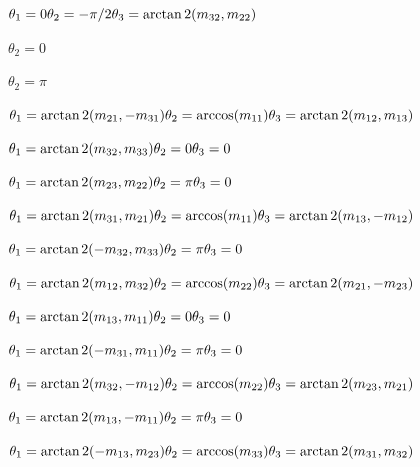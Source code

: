 \documentclass{article}
\begin{document}
$ \theta_1=0\\ \theta_2=-\pi/2\\ \theta_3=\arctan2(m_{32},m_{22}) $
\pagebreak

$\theta_2 = 0$
\pagebreak

$\theta_2 = π$
\pagebreak

$ \theta_1 = \arctan2(m_{21},-m_{31})\\\theta_2 =\arccos(m_{11}) \\\theta_3 = \arctan2(m_{12},m_{13}) $
\pagebreak

$ \theta_1=\arctan2(m_{32},m_{33})\\ \theta_2=0\\ \theta_3=0 $
\pagebreak

$ \theta_1=\arctan2(m_{23},m_{22})\\ \theta_2=\pi\\ \theta_3=0 $
\pagebreak

$ \theta_1 = \arctan2(m_{31},m_{21})\\\theta_2 = \arccos(m_{11}) \\\theta_3 = \arctan2(m_{13},-m_{12}) $
\pagebreak

$ \theta_1=\arctan2(-m_{32},m_{33})\\ \theta_2=\pi\\ \theta_3=0 $
\pagebreak

$ \theta_1 = \arctan2(m_{12},m_{32})\\\theta_2 = \arccos(m_{22}) \\\theta_3 = \arctan2(m_{21},-m_{23}) $
\pagebreak

$ \theta_1=\arctan2(m_{13},m_{11})\\ \theta_2=0\\ \theta_3=0 $
\pagebreak

$ \theta_1=\arctan2(-m_{31},m_{11})\\ \theta_2=\pi\\ \theta_3=0 $
\pagebreak

$ \theta_1 = \arctan2(m_{32},-m_{12})\\\theta_2 = \arccos(m_{22}) \\\theta_3 =\arctan2(m_{23},m_{21}) $
\pagebreak

$ \theta_1=\arctan2(m_{13},-m_{11})\\ \theta_2=\pi\\ \theta_3=0 $
\pagebreak

$ \theta_1 = \arctan2(-m_{13},m_{23})\\\theta_2 = \arccos(m_{33}) \\\theta_3 =\arctan2(m_{31},m_{32}) $
\pagebreak
\end{document}

